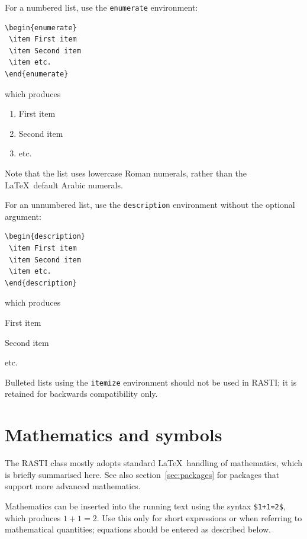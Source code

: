 \documentclass[fleqn,usenatbib,useAMS]{rasti}
\begin{document}
For a numbered list, use the \verb'enumerate' environment:
\begin{verbatim}
\begin{enumerate}
 \item First item
 \item Second item
 \item etc.
\end{enumerate}
\end{verbatim}
\noindent which produces
\begin{enumerate}
 \item First item
 \item Second item
 \item etc.
\end{enumerate}
Note that the list uses lowercase Roman numerals, rather than the \LaTeX\ default Arabic numerals.

For an unnumbered list, use the \verb'description' environment without the optional argument:
\begin{verbatim}
\begin{description}
 \item First item
 \item Second item
 \item etc.
\end{description}
\end{verbatim}
\noindent which produces
\begin{description}
 \item First item
 \item Second item
 \item etc.
\end{description}

Bulleted lists using the \verb'itemize' environment should not be used in RASTI; it is retained for backwards compatibility only.

\section{Mathematics and symbols}

The RASTI class mostly adopts standard \LaTeX\ handling of mathematics, which is briefly summarised here.
See also section~\ref{sec:packages} for packages that support more advanced mathematics.

Mathematics can be inserted into the running text using the syntax \verb'$1+1=2$', which produces $1+1=2$.
Use this only for short expressions or when referring to mathematical quantities; equations should be entered as described below.
\end{document}
